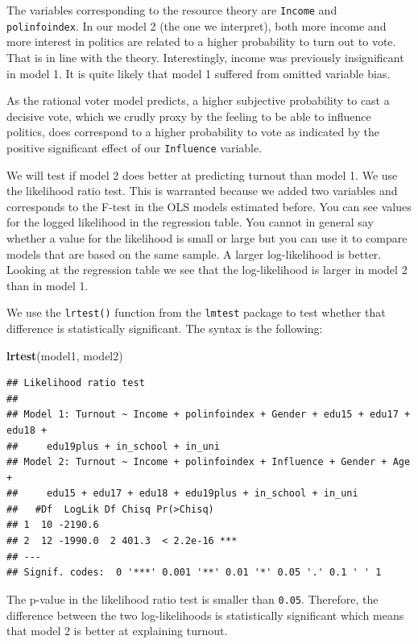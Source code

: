 \documentclass[]{article}
\newenvironment{Shaded}{\begin{snugshade}}{\end{snugshade}}
\newcommand{\KeywordTok}[1]{\textcolor[rgb]{0.13,0.29,0.53}{\textbf{{#1}}}}
\newcommand{\NormalTok}[1]{{#1}}
\theoremstyle{definition}
\theoremstyle{definition}
\theoremstyle{remark}
\begin{document}
The variables corresponding to the resource theory are \texttt{Income}
and \texttt{polinfoindex}. In our model 2 (the one we interpret), both
more income and more interest in politics are related to a higher
probability to turn out to vote. That is in line with the theory.
Interestingly, income was previously insignificant in model 1. It is
quite likely that model 1 suffered from omitted variable bias.

As the rational voter model predicts, a higher subjective probability to
cast a decisive vote, which we crudly proxy by the feeling to be able to
influence politics, does correspond to a higher probability to vote as
indicated by the positive significant effect of our \texttt{Influence}
variable.

We will test if model 2 does better at predicting turnout than model 1.
We use the likelihood ratio test. This is warranted because we added two
variables and corresponds to the F-test in the OLS models estimated
before. You can see values for the logged likelihood in the regression
table. You cannot in general say whether a value for the likelihood is
small or large but you can use it to compare models that are based on
the same sample. A larger log-likelihood is better. Looking at the
regression table we see that the log-likelihood is larger in model 2
than in model 1.

We use the \texttt{lrtest()} function from the \texttt{lmtest} package
to test whether that difference is statistically significant. The syntax
is the following:

\begin{Shaded}
\begin{Highlighting}[]
\KeywordTok{lrtest}\NormalTok{(model1, model2)}
\end{Highlighting}
\end{Shaded}

\begin{verbatim}
## Likelihood ratio test
## 
## Model 1: Turnout ~ Income + polinfoindex + Gender + edu15 + edu17 + edu18 + 
##     edu19plus + in_school + in_uni
## Model 2: Turnout ~ Income + polinfoindex + Influence + Gender + Age + 
##     edu15 + edu17 + edu18 + edu19plus + in_school + in_uni
##   #Df  LogLik Df Chisq Pr(>Chisq)    
## 1  10 -2190.6                        
## 2  12 -1990.0  2 401.3  < 2.2e-16 ***
## ---
## Signif. codes:  0 '***' 0.001 '**' 0.01 '*' 0.05 '.' 0.1 ' ' 1
\end{verbatim}

The p-value in the likelihood ratio test is smaller than \texttt{0.05}.
Therefore, the difference between the two log-likelihoods is
statistically significant which means that model 2 is better at
explaining turnout.
\end{document}
